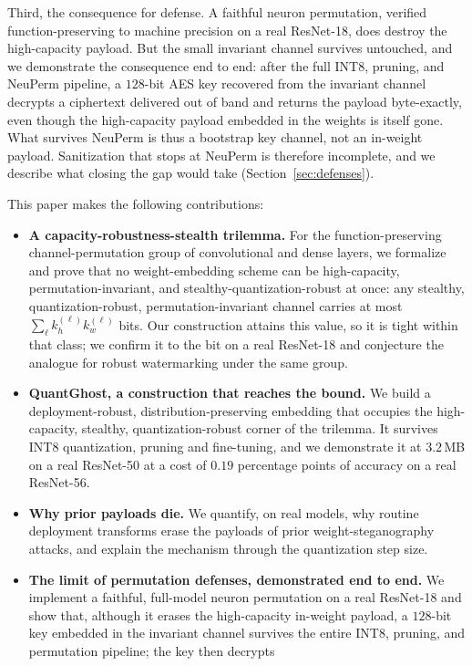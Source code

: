 \documentclass[a4paper,fleqn]{cas-dc}
\theoremstyle{plain}
\theoremstyle{remark}
\newcommand{\sys}{\mbox{QuantGhost}}
\begin{document}
Third, the consequence for defense. A faithful neuron permutation, verified
function-preserving to machine precision on a real ResNet-18, does destroy the
high-capacity payload. But the small invariant channel survives untouched, and we
demonstrate the consequence end to end: after the full INT8, pruning, and NeuPerm
pipeline, a $128$-bit AES key recovered from the invariant channel decrypts a ciphertext
delivered out of band and returns the payload byte-exactly, even though the high-capacity
payload embedded in the weights is itself gone. What survives NeuPerm is thus a bootstrap
key channel, not an in-weight payload. Sanitization that stops at NeuPerm is therefore
incomplete, and we describe what closing the gap would take (Section~\ref{sec:defenses}).

This paper makes the following contributions:
\begin{itemize}
\item \textbf{A capacity-robustness-stealth trilemma.} For the function-preserving
  channel-permutation group of convolutional and dense layers, we formalize and prove that
  no weight-embedding scheme can be high-capacity, permutation-invariant, and
  stealthy-quantization-robust at once: any stealthy, quantization-robust,
  permutation-invariant channel carries at most $\sum_\ell k_h^{(\ell)} k_w^{(\ell)}$ bits.
  Our construction attains this value, so it is tight within that class; we confirm it to the
  bit on a real ResNet-18 and conjecture the analogue for robust watermarking under the same
  group.
\item \textbf{\sys, a construction that reaches the bound.} We build a
  deployment-robust, distribution-preserving embedding that occupies the
  high-capacity, stealthy, quantization-robust corner of the trilemma. It survives INT8
  quantization, pruning and fine-tuning, and we demonstrate it at $3.2$\,MB on a real
  ResNet-50 at a cost of $0.19$ percentage points of accuracy on a real ResNet-56.
\item \textbf{Why prior payloads die.} We quantify, on real models, why routine
  deployment transforms erase the payloads of prior weight-steganography attacks, and
  explain the mechanism through the quantization step size.
\item \textbf{The limit of permutation defenses, demonstrated end to end.} We implement
  a faithful, full-model neuron permutation on a real ResNet-18 and show that, although it
  erases the high-capacity in-weight payload, a $128$-bit key embedded in the invariant
  channel survives the entire INT8, pruning, and permutation pipeline; the key then decrypts

\end{itemize}
\end{document}
